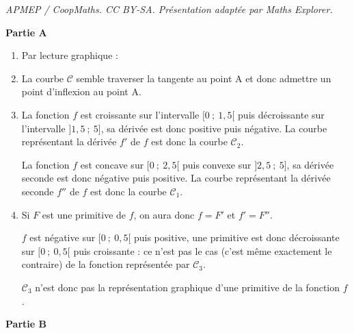 \documentclass[10pt]{article}
\begin{document}
\noindent\textit{APMEP / CoopMaths. CC BY-SA. Présentation adaptée par Maths Explorer.}\par\medskip
\medskip

\textbf{Partie A}


\begin{enumerate}
	\item  Par lecture graphique :

	\begin{center}
	\end{center}



	\item La courbe $\mathcal{C}$  semble traverser la tangente au point A et donc  admettre un point d'inflexion au point A.

	\item La fonction $f$ est croissante sur l'intervalle $[0~;~1,5[$ puis décroissante sur l'intervalle $]1,5~;~5]$, sa dérivée est donc positive puis négative. La courbe représentant la dérivée $f'$ de $f$ est donc la courbe $\mathcal{C}_2$.

	La fonction $f$ est concave sur $[0~;~2,5[$ puis convexe sur $]2,5~;~5]$, sa dérivée seconde est donc négative puis positive. La courbe représentant la dérivée seconde $f''$ de $f$ est donc la courbe $\mathcal{C}_1$.

	\item Si $F$  est une primitive de $f$, on aura donc $f = F'$ et $f'= F''$.

$f$ est négative sur $[0~;~0,5[$ puis positive, une primitive est donc décroissante sur $[0~;~0,5[$ puis croissante : ce n'est pas le cas (c'est même exactement le contraire) de la fonction représentée par $\mathcal{C}_3$.

$\mathcal{C}_3$ n'est donc pas la représentation graphique d'une primitive de la fonction $f$.




\end{enumerate}

\textbf{Partie B}
\end{document}
